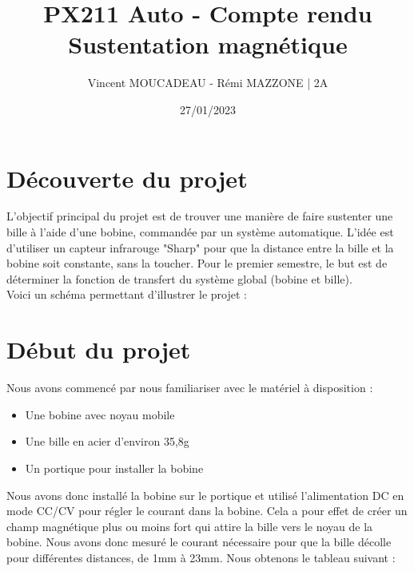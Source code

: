 \documentclass[12pt]{article}
\title{PX211 Auto - Compte rendu \\ Sustentation magnétique}
\author{Vincent MOUCADEAU - Rémi MAZZONE | 2A}
\date{27/01/2023}
\begin{document}
\maketitle

\tableofcontents
\newpage


\section{Découverte du projet}
L'objectif principal du projet est de trouver une manière de faire sustenter une bille à l'aide d'une bobine, commandée par un système automatique. L'idée est d'utiliser un capteur infrarouge "Sharp" pour que la distance entre la bille et la bobine soit constante, sans la toucher. Pour le premier semestre, le but est de déterminer la fonction de transfert du système global (bobine et bille). \\ Voici un schéma permettant d'illustrer le projet :
\begin{center} 
\end{center}


\section{Début du projet}
Nous avons commencé par nous familiariser avec le matériel à disposition :
\begin{itemize}
    \item Une bobine avec noyau mobile
    \item Une bille en acier d'environ 35,8g
    \item Un portique pour installer la bobine
\end{itemize} 
Nous avons donc installé la bobine sur le portique et utilisé l'alimentation DC en mode CC/CV pour régler le courant dans la bobine. Cela a pour effet de créer un champ magnétique plus ou moins fort qui attire la bille vers le noyau de la bobine. Nous avons donc mesuré le courant nécessaire pour que la bille décolle pour différentes distances, de 1mm à 23mm. Nous obtenons le tableau suivant : \newline
\end{document}
